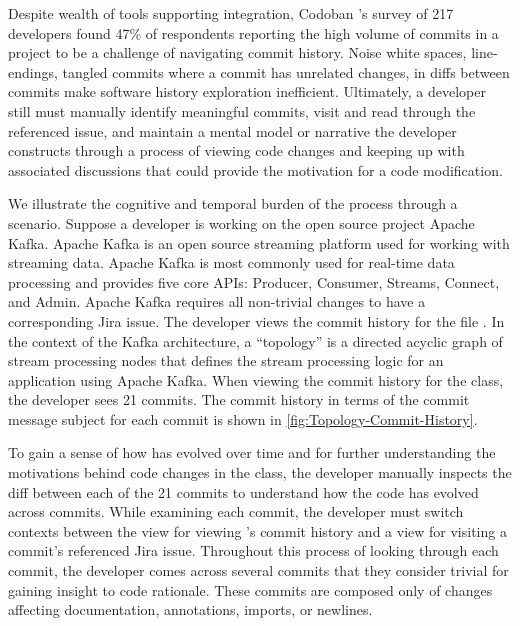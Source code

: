 Despite wealth of tools supporting  integration, Codoban \etal's \cite{codoban_software_2015} survey of 217 developers found 47\% of respondents reporting the high volume of commits in a project to be a challenge of navigating commit history. 
Noise \eg white spaces, line-endings, tangled commits where a commit has unrelated changes, \etc in diffs between commits make software history exploration inefficient. 
Ultimately, a developer still must manually identify meaningful commits, visit and read through the referenced issue, and maintain a mental model or narrative the developer constructs through a process of viewing code changes and keeping up with associated discussions that could provide the motivation for a code modification. 

We illustrate the cognitive and temporal burden of the process through a scenario.
Suppose a developer is working on the open source project Apache Kafka. 
Apache Kafka is an open source streaming platform used for working with streaming data. Apache Kafka is most commonly used for real-time data processing and provides five core APIs: Producer, Consumer, Streams, Connect, and Admin.
Apache Kafka requires all non-trivial changes to have a corresponding Jira issue. 
The developer views the commit history for the file .
In the context of the Kafka architecture, a ``topology'' is a directed acyclic graph of stream processing nodes that defines the stream processing logic for an application using Apache Kafka.
When viewing the commit history for the  class, the developer sees 21 commits.
The commit history in terms of the commit message subject for each commit is shown in \autoref{fig:Topology-Commit-History}.

To gain a sense of how  has evolved over time and for further understanding the motivations behind code changes in the class, the developer manually inspects the diff between each of the 21 commits to understand how the code has evolved across commits.
While examining each commit, the developer must switch contexts between the view for viewing 's commit history and a view for visiting a commit's referenced Jira issue.
Throughout this process of looking through each commit, the developer comes across several commits that they consider trivial for gaining insight to code rationale. 
These commits are composed only of changes affecting documentation, annotations, imports, or newlines. 


